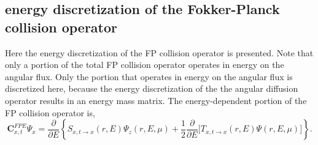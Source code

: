 \documentclass[../main.tex]{subfiles}
\begin{document}
\subsection{\dG energy discretization of the Fokker-Planck collision operator}
Here the \dG energy discretization of the FP collision operator is presented. Note that only a portion of the total FP collision operator operates in energy on the angular flux. Only the portion that operates in energy on the angular flux is discretized here, because the \dG energy discretization  of the the angular diffusion operator results in an energy mass matrix. The energy-dependent portion of the FP collision operator is,
\begin{equation} \label{eqn:FP_energy_dependent}
    \boldsymbol{C}_{x,t}^{FPE} \Psi_x = \dfrac{\partial}{\partial E} \left\lbrace S_{x,t\rightarrow x}(r,E) \Psi_z(r,E,\mu)  + \dfrac{1}{2} \dfrac{\partial}{\partial E} \Big[ T_{x,t\rightarrow x}(r,E) \Psi(r,E,\mu) \Big] \right\rbrace.
\end{equation}
\end{document}
